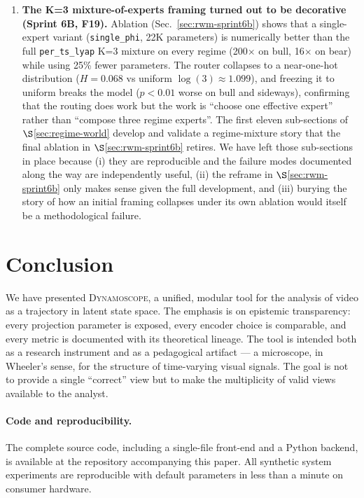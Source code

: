 \documentclass[11pt,a4paper]{article}
\begin{document}
\begin{enumerate}[label=L\arabic*., leftmargin=*]
  windows are only $n{=}4$ per seed. The $p$-value is therefore a
  small-sample significance and the effect size estimate has wide
  intervals. A 10-year period spanning the 2018 and 2022 crashes,
  intraday data, or a wider set of tickers (SPY, NDAQ, gold, FX)
  is required for a robust ``deployable on real finance'' claim.
\item \textbf{The K=3 mixture-of-experts framing turned out to be
  decorative (Sprint 6B, F19).} Ablation
  (Sec.~\ref{sec:rwm-sprint6b}) shows that a single-expert variant
  (\texttt{single\_phi}, 22K parameters) is numerically better than
  the full \texttt{per\_ts\_lyap} K=3 mixture on every regime
  (200$\times$ on bull, 16$\times$ on bear) while using 25\% fewer
  parameters. The router collapses to a near-one-hot distribution
  ($H{=}0.068$ vs uniform $\log(3) {\approx}1.099$), and freezing
  it to uniform breaks the model ($p{<}0.01$ worse on bull and
  sideways), confirming that the routing does work but the work is
  ``choose one effective expert'' rather than ``compose three regime
  experts''. The first eleven sub-sections of $\S$\ref{sec:regime-world}
  develop and validate a regime-mixture story that the final ablation
  in $\S$\ref{sec:rwm-sprint6b} retires. We have left those
  sub-sections in place because (i) they are reproducible and the
  failure modes documented along the way are independently useful,
  (ii) the reframe in $\S$\ref{sec:rwm-sprint6b} only makes sense
  given the full development, and (iii) burying the story of how an
  initial framing collapses under its own ablation would itself be a
  methodological failure.
\end{enumerate}

\section{Conclusion}

We have presented \textsc{Dynamoscope}, a unified, modular tool for
the analysis of video as a trajectory in latent state space. The
emphasis is on epistemic transparency: every projection parameter is
exposed, every encoder choice is comparable, and every metric is
documented with its theoretical lineage. The tool is intended both
as a research instrument and as a pedagogical artifact ---
a microscope, in Wheeler's sense, for the structure of time-varying
visual signals. The goal is not to provide a single ``correct''
view but to make the multiplicity of valid views available to the
analyst.

\paragraph{Code and reproducibility.}
The complete source code, including a single-file front-end and a
Python backend, is available at the repository accompanying this
paper. All synthetic system experiments are reproducible with
default parameters in less than a minute on consumer hardware.
\end{document}
